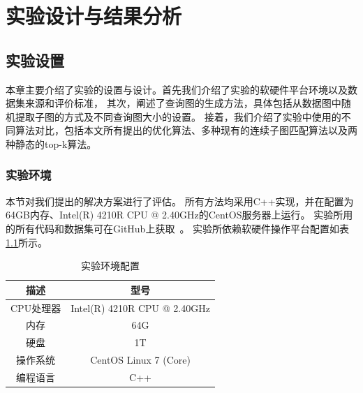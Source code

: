 \def\itk{KiSD}
\def\pm{PBSM}
\chapter{实验设计与结果分析}
\label{ch5:experiment}
\section{实验设置}
本章主要介绍了实验的设置与设计。首先我们介绍了实验的软硬件平台环境以及数据集来源和评价标准，
其次，阐述了查询图的生成方法，具体包括从数据图中随机提取子图的方式及不同查询图大小的设置。
接着，我们介绍了实验中使用的不同算法对比，包括本文所有提出的优化算法、多种现有的连续子图匹配算法以及两种静态的top-k算法。
\subsection{实验环境}
本节对我们提出的解决方案进行了评估。
所有方法均采用C++实现，并在配置为64GB内存、Intel(R) 4210R CPU @ 2.40GHz的CentOS服务器上运行。
实验所用的所有代码和数据集可在GitHub上获取~\cite{code-git-csmtok}。
实验所依赖软硬件操作平台配置如表\ref{table:setup}所示。
\begin{table}[H]
    \centering
    \caption{实验环境配置}
    \label{table:setup}
    \begin{tabular}{cc}
        \toprule
        描述   & 型号  \\
        \midrule
        CPU处理器 & Intel(R) 4210R CPU @ 2.40GHz\\
        内存 & 64G \\
        硬盘 & 1T\\
        操作系统 & CentOS Linux 7 (Core)\\
        编程语言 & C++ \\
        \bottomrule
    \end{tabular}
\end{table}

